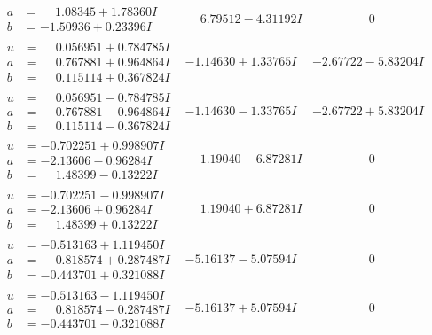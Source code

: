 \documentclass[1p]{elsarticle_modified}
\theoremstyle{definition}
\begin{document}
$$\begin{array}{c|c|c}
\begin{aligned}
a &= \phantom{-}1.08345 + 1.78360 I \\
b &= -1.50936 + 0.23396 I\end{aligned}
 & \phantom{-}6.79512 - 4.31192 I & \phantom{-0.000000 } 0 \\ \hline\begin{aligned}
u &= \phantom{-}0.056951 + 0.784785 I \\
a &= \phantom{-}0.767881 + 0.964864 I \\
b &= \phantom{-}0.115114 + 0.367824 I\end{aligned}
 & -1.14630 + 1.33765 I & -2.67722 - 5.83204 I \\ \hline\begin{aligned}
u &= \phantom{-}0.056951 - 0.784785 I \\
a &= \phantom{-}0.767881 - 0.964864 I \\
b &= \phantom{-}0.115114 - 0.367824 I\end{aligned}
 & -1.14630 - 1.33765 I & -2.67722 + 5.83204 I \\ \hline\begin{aligned}
u &= -0.702251 + 0.998907 I \\
a &= -2.13606 - 0.96284 I \\
b &= \phantom{-}1.48399 - 0.13222 I\end{aligned}
 & \phantom{-}1.19040 - 6.87281 I & \phantom{-0.000000 } 0 \\ \hline\begin{aligned}
u &= -0.702251 - 0.998907 I \\
a &= -2.13606 + 0.96284 I \\
b &= \phantom{-}1.48399 + 0.13222 I\end{aligned}
 & \phantom{-}1.19040 + 6.87281 I & \phantom{-0.000000 } 0 \\ \hline\begin{aligned}
u &= -0.513163 + 1.119450 I \\
a &= \phantom{-}0.818574 + 0.287487 I \\
b &= -0.443701 + 0.321088 I\end{aligned}
 & -5.16137 - 5.07594 I & \phantom{-0.000000 } 0 \\ \hline\begin{aligned}
u &= -0.513163 - 1.119450 I \\
a &= \phantom{-}0.818574 - 0.287487 I \\
b &= -0.443701 - 0.321088 I\end{aligned}
 & -5.16137 + 5.07594 I & \phantom{-0.000000 } 0 \\ \hline\begin{aligned}

\end{aligned}
\end{array}$$
\end{document}

